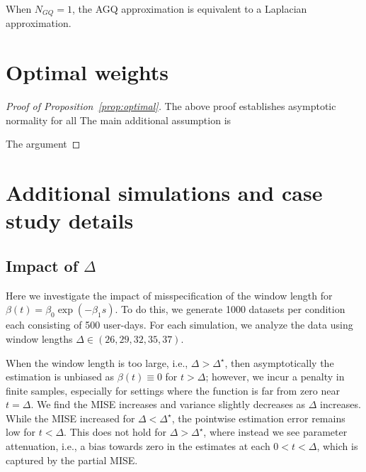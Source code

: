 \documentclass[12pt]{amsart}
\begin{document}
When $N_{GQ} = 1$, the AGQ approximation is equivalent to a Laplacian approximation.


\section{Optimal weights}

\begin{proof}[Proof of Proposition~\ref{prop:optimal}]
The above proof establishes asymptotic normality for all
The main additional assumption is

The argument

\end{proof}

\section{Additional simulations and case study details}

\subsection{Impact of $\Delta$}
\label{app:delta}

Here we investigate the impact of misspecification of the window length for $\beta(t) = \beta_0 \exp \left( - \beta_1 s \right)$.  To do this, we generate 1000 datasets per condition each consisting of 500 user-days.  For each simulation, we analyze the data using window lengths $\Delta \in (26,29,32,35,37)$.

When the window length is too large, i.e., $\Delta > \Delta^\star$, then asymptotically the estimation is unbiased as $\beta(t) \equiv 0$ for $t > \Delta$; however, we incur a penalty in finite samples, especially for settings where the function is far from zero near $t = \Delta$.  We find the MISE increases and variance slightly decreases as $\Delta$ increases.  While the MISE increased for $\Delta < \Delta^\star$, the pointwise estimation error remains low for $t < \Delta$.  This does not hold for $\Delta > \Delta^\star$, where instead we see parameter attenuation, i.e., a bias towards zero in the estimates at each $0 < t< \Delta$, which is captured by the partial MISE.
\end{document}
